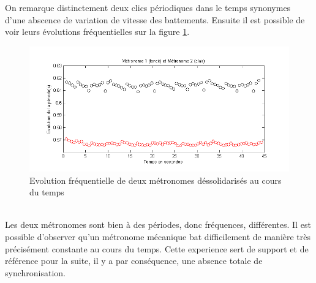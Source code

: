 \documentclass[a4paper,11pt]{report}
\begin{document}
On remarque distinctement deux clics périodiques dans le temps synonymes d'une abscence de variation de vitesse des battements. Ensuite il est possible de voir leurs évolutions fréquentielles sur la figure \ref{CaractérisationF}.
\begin{figure}[h]
\centering
\includegraphics[width=1\textwidth]{Caracterisation_Frequence_200BPM}
\caption{Evolution fréquentielle de deux métronomes déssolidarisés au cours du temps}\label{CaractérisationF}
\end{figure}\\

Les deux métronomes sont bien à des périodes, donc fréquences, différentes. Il est possible d'observer qu'un métronome mécanique bat difficilement de manière très précisément constante au cours du temps. Cette experience sert de support et de référence pour la suite, il y a par conséquence, une absence totale de synchronisation.
\end{document}
